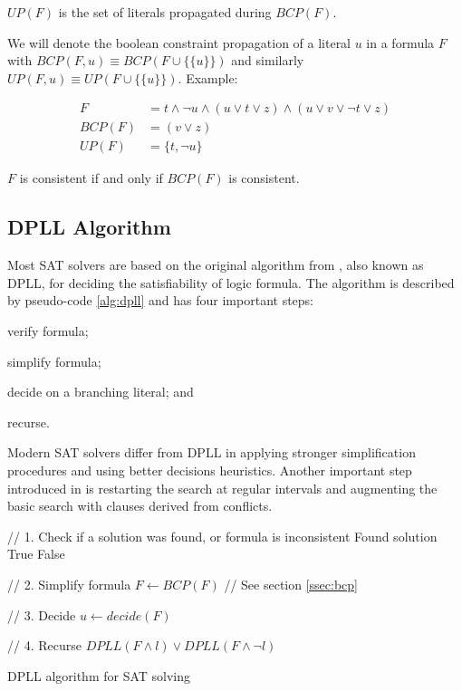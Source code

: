 \begin{mydef}
$UP(F)$ is the set of literals propagated during $BCP(F)$.
\end{mydef}

We will denote the boolean constraint propagation of a literal $u$ in a
formula $F$ with $BCP(F, u) \equiv BCP(F \cup \{\{ u \}\})$
and similarly $UP(F, u) \equiv UP(F \cup \{\{ u \}\})$. Example:

\begin{align}
  F &= t \land \neg u \land (u \lor t \lor z) \land (u \lor v \lor \neg t \lor z) \\
  BCP(F) &= (v \lor z) \\
  UP(F) &= \{ t, \neg u \}
\end{align}

\begin{myprop}
  $F$ is consistent if and only if $BCP(F)$ is consistent.
\end{myprop}


\subsection{DPLL Algorithm}
\label{ssec:dpll}

Most SAT solvers are based on the original algorithm from
\cite{Davis:1962:MPT:368273.368557}, also known as DPLL, for deciding
the satisfiability of logic formula.  The algorithm is described
by pseudo-code \ref{alg:dpll} and has four important steps:
\begin{inparaenum}[1)]
  \item verify formula;
  \item simplify formula;
  \item decide on a branching literal; and
  \item recurse.
\end{inparaenum}

Modern SAT solvers differ from DPLL in applying
stronger simplification procedures and using better
decisions heuristics. Another important step introduced in
\cite{Marques-silva99grasp:a} is restarting the search at regular
intervals and augmenting the basic search with clauses derived
from conflicts.


\begin{algorithm}
  \begin{algorithmic}

    // 1. Check if a solution was found, or formula is inconsistent
      \PRINT Found solution
      \RETURN True
    \ENDIF
      \RETURN False
    \ENDIF

    // 2. Simplify formula
    \STATE $F \gets BCP(F)$ // See section \ref{ssec:bcp}

    // 3. Decide
    \STATE $u \gets decide(F)$

    // 4. Recurse
    \RETURN $DPLL(F \land l) \lor DPLL(F \land \neg l)$
  \end{algorithmic}

  \caption{DPLL algorithm for SAT solving}
  \label{alg:dpll}
\end{algorithm}


